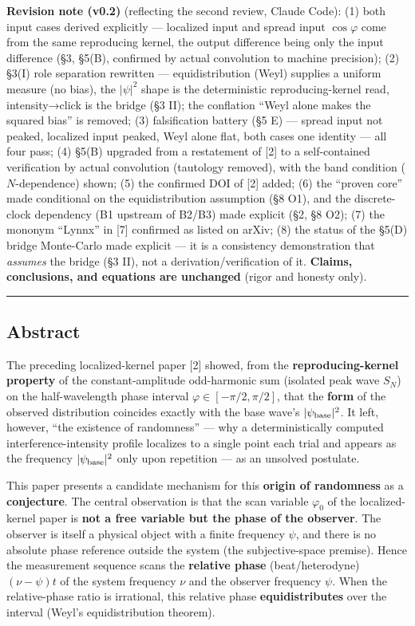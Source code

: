 \documentclass[
]{ltjsarticle}
\begin{document}
\textbf{Revision note (v0.2)} (reflecting the second review, Claude
Code): (1) both input cases derived explicitly --- localized input and
spread input \(\cos\varphi\) come from the same reproducing kernel, the
output difference being only the input difference (§3, §5(B), confirmed
by actual convolution to machine precision); (2) §3(I) role separation
rewritten --- equidistribution (Weyl) supplies a uniform measure (no
bias), the \(|\psi|^2\) shape is the deterministic reproducing-kernel
read, intensity→click is the bridge (§3 II); the conflation ``Weyl alone
makes the squared bias'' is removed; (3) falsification battery (§5 E)
--- spread input not peaked, localized input peaked, Weyl alone flat,
both cases one identity --- all four pass; (4) §5(B) upgraded from a
restatement of {[}2{]} to a self-contained verification by actual
convolution (tautology removed), with the band condition
(\(N\)-dependence) shown; (5) the confirmed DOI of {[}2{]} added; (6)
the ``proven core'' made conditional on the equidistribution assumption
(§8 O1), and the discrete-clock dependency (B1 upstream of B2/B3) made
explicit (§2, §8 O2); (7) the mononym ``Lynnx'' in {[}7{]} confirmed as
listed on arXiv; (8) the status of the §5(D) bridge Monte-Carlo made
explicit --- it is a consistency demonstration that \emph{assumes} the
bridge (§3 II), not a derivation/verification of it. \textbf{Claims,
conclusions, and equations are unchanged} (rigor and honesty only).

\begin{center}\rule{0.5\linewidth}{0.5pt}\end{center}

\subsection{Abstract}\label{abstract}

The preceding localized-kernel paper {[}2{]} showed, from the
\textbf{reproducing-kernel property} of the constant-amplitude
odd-harmonic sum (isolated peak wave \(S_N\)) on the half-wavelength
phase interval \(\varphi\in[-\pi/2,\pi/2]\), that the \textbf{form} of
the observed distribution coincides exactly with the base wave's
\(|\psi_{\rm base}|^2\). It left, however, ``the existence of
randomness'' --- why a deterministically computed interference-intensity
profile localizes to a single point each trial and appears as the
frequency \(|\psi_{\rm base}|^2\) only upon repetition --- as an
unsolved postulate.

This paper presents a candidate mechanism for this \textbf{origin of
randomness} as a \textbf{conjecture}. The central observation is that
the scan variable \(\varphi_0\) of the localized-kernel paper is
\textbf{not a free variable but the phase of the observer}. The observer
is itself a physical object with a finite frequency \(\psi\), and there
is no absolute phase reference outside the system (the subjective-space
premise). Hence the measurement sequence scans the \textbf{relative
phase} (beat/heterodyne) \((\nu-\psi)t\) of the system frequency \(\nu\)
and the observer frequency \(\psi\). When the relative-phase ratio is
irrational, this relative phase \textbf{equidistributes} over the
interval (Weyl's equidistribution theorem).
\end{document}
